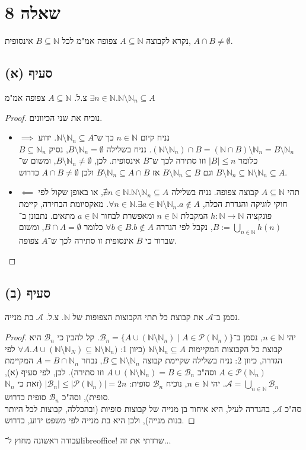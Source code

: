 \documentclass[]{article}
\newcommand\N     {\mathbb{N}}
\newcommand\ps    {\mathcal{P}}
\newcommand\ac    {\mathcal{A}}
\newcommand\bc    {\mathcal{B}}
\begin{document}
	\section*{שאלה 8}
	נקרא לקבוצה $ A \subseteq \N $ צפופה אמ"מ לכל $ B \subseteq \N $ אינסופית, $ A \cap B \neq \emptyset $. 
	\subsection*{סעיף (א)}
	צ.ל. $ A\subseteq\N $ צפופה אמ"מ $ \exists n \in \N. \N \setminus \N_n \subseteq A $
	\begin{proof}
		נוכיח את שני הכיוונים. 
		\begin{itemize}
			\item $ \implies $ נניח קיום $ n \in \N $ כך ש־$ \N \setminus \N_n \subseteq A $. ידוע $ (\N \setminus \N_n) \cap B =(\N \cap B) \setminus \N_n = B \setminus \N_n$. נניח בשלילה $ B \setminus \N_n = \emptyset $, נסיק $ B \subseteq \N_n $ כלומר $ |B| \le n $ וזו סתירה לכך ש־$ B $ אינסופית. לכן, $ B \setminus \N_n \neq \emptyset $, ומשום ש־$ B \setminus \N_n \subseteq \N \setminus \N_n \subseteq A $ וגם $ B \setminus \N_n \subseteq B $ אז $ B \setminus \N_n \subseteq A \cap B $ ולכן $ A \cap B \neq \emptyset $ כדרוש. 
			\item $ \impliedby $ תהי $ A \subseteq \N $ קבוצה צפופה. נניח בשלילה $ \nexists n \in \N. \N \setminus \N_n \subseteq A $, או באופן שקול לפי חוקי לוגיקה והגדרת הכלה,  $ \forall n \in \N. \exists a \in \N \setminus \N_n. a \not\in A $. מאקסיומת הבחירה, קיימת פונקציה $ h \colon \N \to \N $ המקבלת $ n \in \N $ ומאפשרת לבחור $ a \in \N $ מתאים. נתבונן ב־$ B := \bigcup_{n \in \N} h(n) $, נקבל לפי הגדרה $ \forall b \in B. b \not\in A $ כלומר $ B \cap A =  \emptyset $, ומשום שברור כי $ B $ אינסופית זו סתירה לכך ש־$ A $ צפופה. 
		\end{itemize}
	\end{proof}
	
	\subsection*{סעיף (ב)}
	נסמן ב־$ \ac $ את קבוצת כל תתי הקבוצות הצפופות של $ \N $. צ.ל. $ \ac $ בת מנייה. 
	\begin{proof}
		יהי $ n \in \N $, נסמן ב־$ \bc_n = \{A \cup (\N \setminus \N_n) \mid A \in \ps(\N_n)\} $. קל להבין כי $ \bc_n $ היא קבוצת כל הקבוצות המקיימות $ \N \setminus \N_n \subseteq A $ (כיוון 1: $ \forall A. A \cup (\N \setminus \N_N) \subseteq \N \setminus \N_n) $ לפי הגדרה, כיוון 2: נניח בשלילה שקיימת קבוצה $ B \subseteq \N \setminus \N_n $, נבחר $ A = B \cap \N_n $ המקיימת $ A \in \ps(\N_n) $ וסה"כ $ A \cup (\N \setminus \N_n) = B \in \bc_n $ וזו סתירה). לכן, לפי סעיף (א), $ \ac = \bigcup_{n \in \N} \bc_n $. יהי $ n \in \N $, נוכיח $ \bc_n $ סופית: $ |\bc_n| \le |\ps(\N_n)| = 2n $ (זאת כי $ \N_n $ סופית), וסה"כ $ \bc_n $ סופית כדרוש. \\
		סה"כ $ \ac $, בהגדרה לעיל, היא איחוד בן מנייה של קבוצות סופיות (ובהכללה, קבוצות לכל היותר בנות מנייה), ולכן היא בת מנייה לפי משפט ידוע, כדרוש. 
	\end{proof}
	
	עבודה ראשונה מחוץ ל־libreoffice! שרדתי את זה...
\end{document}
